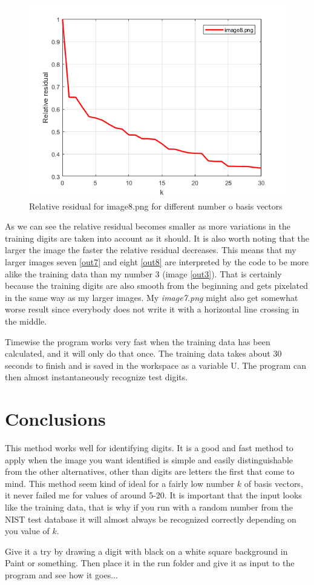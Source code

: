 \documentclass[notitlepage]{report}
\begin{document}
\begin{figure}[!ht]
\centering
\includegraphics[scale=0.65]{image8graph.png}
\caption{Relative residual for image8.png for different number o basis vectors}
\label{graph8}
\end{figure}

As we can see the relative residual becomes smaller as more variations in the training digits are taken into account as it should. It is also worth noting that the larger the image the faster the relative residual decreases. This means that my larger images seven \ref{out7} and eight \ref{out8} are interpreted by the code to be more alike the training data than my number 3 (image \ref{out3}). That is certainly because the training digits are also smooth from the beginning and gets pixelated in the same way as my larger images. My \textit{image7.png} might also get somewhat worse result since everybody does not write it with a horizontal line crossing in the middle.

Timewise the program works very fast when the training data has been calculated, and it will only do that once. The training data takes about 30 seconds to finish and is saved in the workspace as a variable U. The program can then almost instantaneously recognize test digits.

\newpage

\section{Conclusions}
This method works well for identifying digits. It is a good and fast method to apply when the image you want identified is simple and easily distinguishable from the other alternatives, other than digits are letters the first that come to mind. This method seem kind of ideal for a fairly low number $k$ of basis vectors, it never failed me for values of around 5-20. It is important that the input looks like the training data, that is why if you run with a random number from the NIST test database it will almost always be recognized correctly depending on you value of $k$. 

Give it a try by drawing a digit with black on a white square background in Paint or something. Then place it in the run folder and give it as input to the program and see how it goes...


\end{document}
